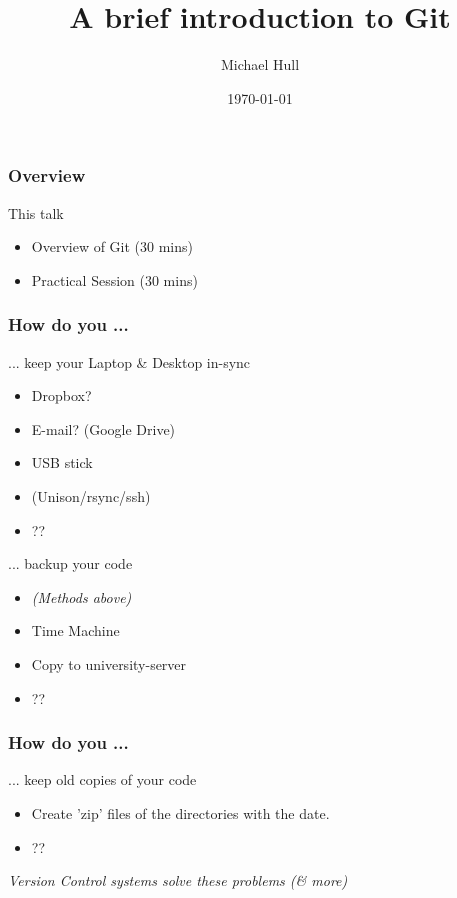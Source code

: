 \documentclass{beamer}
\title[A brief introduction to Git]{A brief introduction to Git}
\author{Michael Hull}
\institute[University of Edinburgh]
{
University of Edinburgh \\
\medskip
{\emph{mikehulluk@googlemail.com}}
}
\date{\today}
\begin{document}
%
\begin{frame}
\titlepage
\end{frame}
%



\begin{frame}
\frametitle{Overview}
\begin{block}
{This talk}
\begin{itemize}
\item Overview of Git (30 mins)
\item Practical Session (30 mins)
\end{itemize}
\end{block}
\end{frame}



\begin{frame}
\frametitle{How do you ...}

\begin{block}
{ ... keep your Laptop \& Desktop in-sync}
\begin{itemize}
\item Dropbox?
\item E-mail? (Google Drive)
\item USB stick
\item (Unison/rsync/ssh)
\item ??
\end{itemize}
\end{block}

\begin{block}
{... backup your code}
\begin{itemize}
\item \emph{(Methods above)} 
\item Time Machine 
\item Copy to university-server
\item ??
\end{itemize}
\end{block}

\end{frame}



\begin{frame}
\frametitle{How do you ...}
\begin{block}
{... keep old copies of your code}	
\begin{itemize}
\item Create 'zip' files of the directories with the date. 
\item ??
\end{itemize}
\end{block}


\begin{block}
{ \emph{Version Control systems solve these problems (\& more)}	}
\end{block}




\end{frame}
\end{document}
